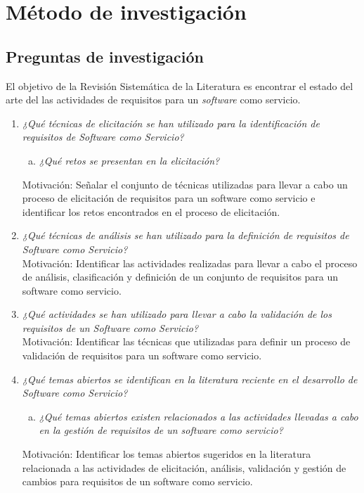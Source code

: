 \documentclass[conference,onecolumn,10pt]{IEEEtran}
\begin{document}
\section{Método de investigación}


\subsection{Preguntas de investigación}
El objetivo de la Revisión Sistemática de la Literatura es encontrar el estado del arte del las actividades de requisitos para un \emph{software} como servicio. 

\begin{enumerate}[P 1.-]
  \item\emph{¿Qué técnicas de elicitación se han utilizado para la identificación de requisitos de Software como Servicio?}
  \begin{enumerate}[(a)]
  \item \emph{¿Qué retos se presentan en la elicitación?}
  \end{enumerate}
  Motivación: Señalar el conjunto de técnicas utilizadas para llevar a cabo un proceso de elicitación de requisitos para un software como servicio e identificar los retos encontrados en el proceso de elicitación. 
  
  \item\emph{¿Qué técnicas de análisis se han utilizado para la definición de requisitos de Software como Servicio?}\\
  Motivación: Identificar las actividades realizadas para llevar a cabo el proceso de análisis, clasificación y definición de un conjunto de requisitos para un software como servicio.

  \item\emph{¿Qué actividades se han utilizado para llevar a cabo la validación de los requisitos de un Software como Servicio?}\\
  Motivación: Identificar las técnicas que utilizadas para definir un proceso de validación de requisitos para un software como servicio.

  \item\emph{¿Qué temas abiertos se identifican en la literatura reciente en el desarrollo de Software como Servicio?}
  \begin{enumerate}[(a)]
  \item \emph{¿Qué temas abiertos existen relacionados a las actividades llevadas a cabo en la gestión de requisitos de un software como servicio?}
  \end{enumerate}
  Motivación: Identificar los temas abiertos sugeridos en la literatura relacionada a las actividades de elicitación, análisis, validación y gestión de cambios 
 para requisitos de un software como servicio.
\end{enumerate}
\end{document}
